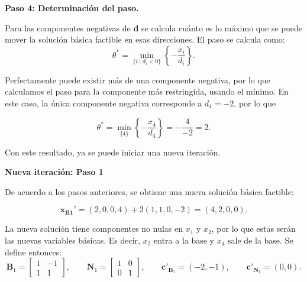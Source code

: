 \begin{enumerate}
    \noindent\textbf{Paso 4: Determinación del paso.}

    Para las componentes negativas de $\mathbf{d}$ se calcula cuánto es lo máximo que se puede mover la solución básica factible en esas direcciones. El paso se calcula como:
    \begin{equation}
        \theta^*
        =
        \min_{\{i \mid d_i < 0\}}
        \left\{
        -\frac{x_i}{d_i}
        \right\}.
    \end{equation}

    Perfectamente puede existir más de una componente negativa, por lo que calculamos el paso para la componente más restringida, usando el mínimo. En este caso, la única componente negativa corresponde a $d_4=-2$, por lo que
    
    \begin{equation}
        \theta^*
        =
        \min_{\{4\}}
        \left\{
        -\frac{x_4}{d_4}
        \right\}
        =
        -\frac{4}{-2}
        =
        2.
    \end{equation}

    Con este resultado, ya se puede iniciar una nueva iteración.

    \noindent\textbf{Nueva iteración: Paso 1}

    De acuerdo a los pasos anteriores, se obtiene una nueva solución básica factible:
    
    \begin{equation}
        \mathbf{x}_{\mathbf{B1}}'
        =
        (2,0,0,4)
        +
        2(1,1,0,-2)
        =
        (4,2,0,0).
    \end{equation}

    La nueva solución tiene componentes no nulas en $x_1$ y $x_2$, por lo que estas serán las nuevas variables básicas. Es decir, $x_2$ entra a la base y $x_4$ sale de la base. Se define entonces:
    \begin{equation}
        \mathbf{B}_1
        =
        \begin{bmatrix}
            1 & -1 \\
            1 & 1
        \end{bmatrix},
        \qquad
        \mathbf{N}_1
        =
        \begin{bmatrix}
            1 & 0 \\
            0 & 1
        \end{bmatrix},
        \qquad
        \mathbf{c}'_{\mathbf{B}_1} = (-2,-1),
        \qquad
        \mathbf{c}'_{\mathbf{N}_1} = (0,0).
    \end{equation}


\end{enumerate}
